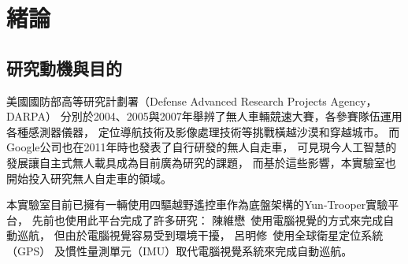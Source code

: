 \chapter{緒論}
\label{c:intro}
\section{研究動機與目的}
美國國防部高等研究計劃署（Defense Advanced Research Projects Agency，DARPA）
分別於2004、2005與2007年舉辨了無人車輛競速大賽，各參賽隊伍運用各種感測器儀器，
定位導航技術及影像處理技術等挑戰橫越沙漠和穿越城市。
而Google公司也在2011年時也發表了自行研發的無人自走車，
可見現今人工智慧的發展讓自主式無人載具成為目前廣為研究的課題，
而基於這些影響，本實驗室也開始投入研究無人自走車的領域。

本實驗室目前已擁有一輛使用四驅越野遙控車作為底盤架構的Yun-Trooper實驗平台，
先前也使用此平台完成了許多研究：
陳維懋~\cite{Chen:2011:Thesis}使用電腦視覺的方式來完成自動巡航，
但由於電腦視覺容易受到環境干擾，
呂明修~\cite{Liu:2012:Thesis}使用全球衛星定位系統（GPS）
及慣性量測單元（IMU）取代電腦視覺系統來完成自動巡航。

